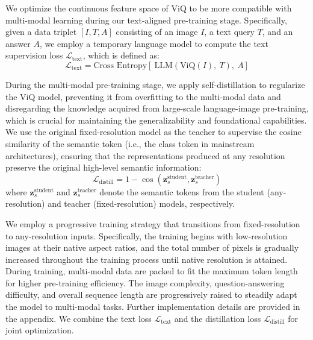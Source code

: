 We optimize the continuous feature space of ViQ to be more compatible with multi-modal learning during our text-aligned pre-training stage. Specifically, given a data triplet $[I, T, A]$ consisting of an image $I$, a text query $T$, and an answer $A$, we employ a temporary language model to compute the text supervision loss $\mathcal{L}_{\text{text}}$, which is defined as:
\begin{equation}
    \mathcal{L}_{\text{text}}=\text{Cross Entropy}[\ \text{LLM}(\text{ViQ}(I),\ T),\ A]
\end{equation}

During the multi-modal pre-training stage, we apply self-distillation to regularize the ViQ model, preventing it from overfitting to the multi-modal data and disregarding the knowledge acquired from large-scale language-image pre-training, which is crucial for maintaining the generalizability and foundational capabilities. We use the original fixed-resolution model as the teacher to supervise the cosine similarity of the semantic token (i.e., the class token in mainstream architectures), ensuring that the representations produced at any resolution preserve the original high-level semantic information:
\begin{equation}
    \mathcal{L}_{\text{distill}} = 1 - \cos\left(\mathbf{z}_s^{\text{student}}, \mathbf{z}_s^{\text{teacher}}\right)
\end{equation}
where \(\mathbf{z}_s^{\text{student}}\) and \(\mathbf{z}_s^{\text{teacher}}\) denote the semantic tokens from the student (any-resolution) and teacher (fixed-resolution) models, respectively.

We employ a progressive training strategy that transitions from fixed-resolution to any-resolution inputs. Specifically, the training begins with low-resolution images at their native aspect ratios, and the total number of pixels is gradually increased throughout the training process until native resolution is attained. During training, multi-modal data are packed to fit the maximum token length for higher pre-training efficiency. The image complexity, question-answering difficulty, and overall sequence length are progressively raised to steadily adapt the model to multi-modal tasks. Further implementation details are provided in the appendix. We combine the text loss \(\mathcal{L}_{\text{text}}\) and the distillation loss \(\mathcal{L}_{\text{distill}}\) for joint optimization.

